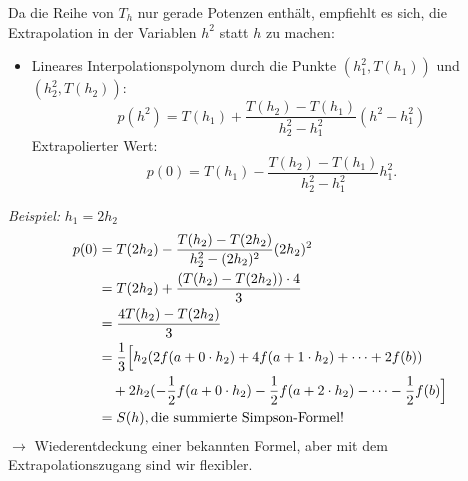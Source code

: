 \bigskip

Da die Reihe von $T_h$ nur gerade Potenzen enthält, empfiehlt es sich, die Extrapolation in der Variablen $h^2$ statt $h$ zu machen:
\begin{center}
\end{center}
\begin{itemize}
\item Lineares Interpolationspolynom durch die Punkte $(h_1^2, T(h_1))$ und $(h_2^2, T(h_2))$:
\begin{equation*}
 p(h^2) = T(h_1) + \frac{T(h_2)- T(h_1)}{h_2^2 - h_1^2} (h^2 - h_1^2)
\end{equation*}
Extrapolierter Wert:
\begin{equation}\label{extrapolierter_wert}
p(0) = T(h_1) - \frac{T(h_2)- T(h_1)}{h_2^2 - h_1^2}h_1^2.
\end{equation}
\end{itemize}
\emph{Beispiel:} $h_1 = 2h_2$
\begin{align*}
 p(0)
 & =
 T(2h_2) - \frac{T(h_2)- T(2h_2)}{h_2^2 - (2h_2)^2}(2h_2)^2 \\
 & =
 T(2h_2) + \frac{(T(h_2)- T(2h_2))\cdot 4}{3} \\
 & =
 \frac{4T(h_2) - T(2h_2)}{3} \\
 & = \frac{1}{3} \Big[h_2 (2f(a+ 0 \cdot h_2) + 4f(a+ 1 \cdot h_2) + \cdots + 2f(b)) \\
 & \quad + 2h_2 (-\frac{1}{2} f(a + 0 \cdot h_2) -\frac{1}{2} f(a + 2\cdot h_2) - \cdots -\frac{1}{2} f(b)\Big] \\
 & = S(h), \textnormal{die summierte Simpson-Formel!}
\end{align*}
$\rightarrow$ Wiederentdeckung einer bekannten Formel, aber mit dem Extrapolationszugang sind wir flexibler.

\bigskip

